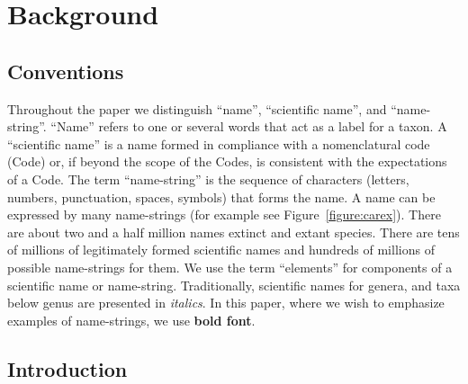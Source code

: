 \documentclass{bmcart}
\begin{document}



\section*{Background}

\subsection*{Conventions}

Throughout the paper we distinguish ``name'', ``scientific name'', and ``name-string''. ``Name'' refers to one or several words that act as a label for a taxon. A ``scientific name'' is a name formed in compliance with a nomenclatural code (Code) or, if beyond the scope of the Codes, is consistent with the expectations of a Code. The term ``name-string'' is the sequence of characters (letters, numbers, punctuation, spaces, symbols) that forms the name. A name can be expressed by many name-strings (for example see Figure~\ref{figure:carex}). There are about two and a half million names extinct and extant species. There are tens of millions of legitimately formed scientific names and hundreds of millions of possible name-strings for them. We use the term ``elements'' for  components of a scientific name or name-string. Traditionally, scientific names for genera, and taxa below genus are presented in \textit{italics}. In this paper, where we wish to emphasize examples of name-strings, we use \textbf{bold font}.

\subsection*{Introduction}
\end{document}
